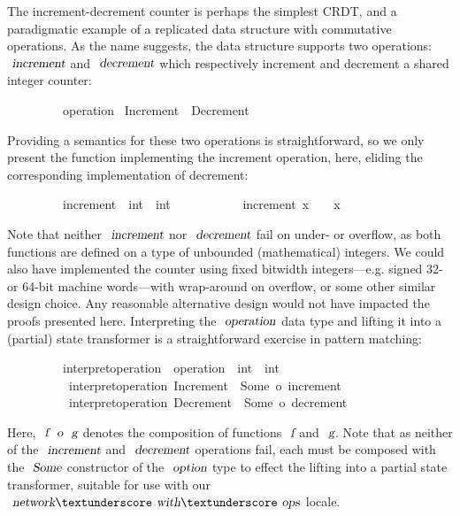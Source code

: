 The increment-decrement counter is perhaps the simplest CRDT, and a paradigmatic example of a replicated data structure with commutative operations.
As the name suggests, the data structure supports two operations: $\isa{increment}$ and $\isa{decrement}$ which respectively increment and decrement a shared integer counter:
\vspace{0.375em}
\begin{isabellebody}
\ \ \ \ \ \ \ \ \ operation {\isacharequal}\ Increment\ {\isacharbar}\ Decrement
\end{isabellebody}
\vspace{0.375em}
Providing a semantics for these two operations is straightforward, so we only present the function implementing the increment operation, here, eliding the corresponding implementation of decrement:
\vspace{0.375em}
\begin{isabellebody}
\ \ \ \ \ \ \ \ \ increment\ {\isacharcolon}{\isacharcolon}\ {\isachardoublequoteopen}int\ {\isasymRightarrow}\ int{\isachardoublequoteclose}\ \isanewline
\ \ \ \ \ \ \ \ \ \ {\isachardoublequoteopen}increment\ x\ {\isasymequiv}\ {}\ {\isacharplus}\ x{\isachardoublequoteclose}
\end{isabellebody}
\vspace{0.375em}
Note that neither $\isa{increment}$ nor $\isa{decrement}$ fail on under- or overflow, as both functions are defined on a type of unbounded (mathematical) integers.
We could also have implemented the counter using fixed bitwidth integers---e.g. signed 32- or 64-bit machine words---with wrap-around on overflow, or some other similar design choice.
Any reasonable alternative design would not have impacted the proofs presented here.
Interpreting the $\isa{operation}$ data type and lifting it into a (partial) state transformer is a straightforward exercise in pattern matching:
\vspace{0.375em}
\begin{isabellebody}
\ \ \ \ \ \ \ \ \ interpret{\isacharunderscore}operation\ {\isacharcolon}{\isacharcolon}\ {\isachardoublequoteopen}operation\ {\isasymRightarrow}\ int\ {\isasymrightharpoonup}\ int{\isachardoublequoteclose}\ \isanewline
\ \ \ \ \ \ \ \ \ \ {\isachardoublequoteopen}interpret{\isacharunderscore}operation\ Increment\ {\isacharequal}\ Some\ o\ increment{\isachardoublequoteclose}\ {\isacharbar}\isanewline
\ \ \ \ \ \ \ \ \ \ {\isachardoublequoteopen}interpret{\isacharunderscore}operation\ Decrement\ {\isacharequal}\ Some\ o\ decrement{\isachardoublequoteclose}\isanewline
\end{isabellebody}
\vspace{0.375em}
Here, $\isa{f}\ \isa{o}\ \isa{g}$ denotes the composition of functions $\isa{f}$ and $\isa{g}$.
Note that as neither of the $\isa{increment}$ and $\isa{decrement}$ operations fail, each must be composed with the $\isa{Some}$ constructor of the $\isa{option}$ type to effect the lifting into a partial state transformer, suitable for use with our $\isa{network}{\isacharunderscore}\isa{with}{\isacharunderscore}\isa{ops}$ locale.

